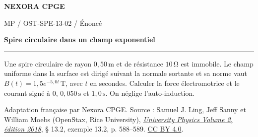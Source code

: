\documentclass[11pt,a4paper]{article}
\begin{document}
\makeatletter
\def\@oddfoot{\footnotesize Download for free at \url{https://openstax.org/details/books/university-physics-volume-2}.\hfil\thepage}
\let\@evenfoot\@oddfoot
\makeatother
{\small\bfseries\color{nexorablue} NEXORA CPGE}\par
{\small MP / OST-SPE-13-02 / Énoncé}\par
{\LARGE\bfseries Spire circulaire dans un champ exponentiel}\par
\vspace{0.25em}\hrule\vspace{0.6em}

Une spire circulaire de rayon $0{,}50\,\mathrm m$ et de résistance $10\,\mathrm\Omega$ est immobile. Le champ uniforme dans la surface est dirigé suivant la normale sortante et sa norme vaut $B(t)=1{,}5 e^{-5{,}0t}\,\mathrm T$, avec $t$ en secondes. Calculer la force électromotrice et le courant signé à $0$, $0{,}050\,\mathrm s$ et $1{,}0\,\mathrm s$. On néglige l’auto-induction.

\bigskip
{\footnotesize Adaptation française par Nexora CPGE. Source : Samuel J. Ling, Jeff Sanny et William Moebs (OpenStax, Rice University),
\href{https://d3bxy9euw4e147.cloudfront.net/oscms-prod/media/documents/UniversityPhysicsVolume2-OP.pdf\#page=598}{\textit{University Physics Volume 2, édition 2018}}, § 13.2, exemple 13.2, p. 588–589.
\href{https://creativecommons.org/licenses/by/4.0/}{CC BY 4.0}.}
\end{document}
